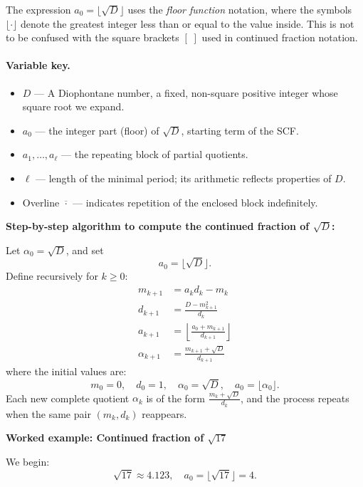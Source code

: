 \documentclass[11pt]{article}
\begin{document}
\smallskip
\noindent
The expression $a_0 = \lfloor \sqrt{D} \rfloor$ uses the \emph{floor function} notation, where the symbols $\lfloor \cdot \rfloor$ denote the greatest integer less than or equal to the value inside. This is not to be confused with the square brackets $[\;]$ used in continued fraction notation.

\paragraph{Variable key.}
\begin{itemize}
  \item $D$ — A Diophontane number, a fixed, non-square positive integer whose square root we expand.
  \item $a_0$ — the integer part (floor) of $\sqrt{D}$, starting term of the SCF.
  \item $a_1,\dots,a_\ell$ — the repeating block of partial quotients.
  \item $\ell$ — length of the minimal period; its arithmetic reflects properties of $D$.
  \item Overline $\overline{\cdot}$ — indicates repetition of the enclosed block indefinitely.
\end{itemize}

\smallskip
\noindent
\textbf{Step-by-step algorithm to compute the continued fraction of \( \sqrt{D} \):}

Let \( \alpha_0 = \sqrt{D} \), and set
\[
a_0 = \lfloor \sqrt{D} \rfloor.
\]
Define recursively for \( k \geq 0 \):
\begin{align*}
m_{k+1} &= a_k d_k - m_k \\
d_{k+1} &= \frac{D - m_{k+1}^2}{d_k} \\
a_{k+1} &= \left\lfloor \frac{a_0 + m_{k+1}}{d_{k+1}} \right\rfloor \\
\alpha_{k+1} &= \frac{m_{k+1} + \sqrt{D}}{d_{k+1}}
\end{align*}
where the initial values are:
\[
m_0 = 0, \quad d_0 = 1, \quad \alpha_0 = \sqrt{D}, \quad a_0 = \lfloor \alpha_0 \rfloor.
\]
Each new complete quotient \( \alpha_k \) is of the form \( \frac{m_k + \sqrt{D}}{d_k} \), and the process repeats when the same pair \( (m_k, d_k) \) reappears.

\bigskip
\noindent
\textbf{Worked example: Continued fraction of \( \sqrt{17} \)}

We begin:
\[
\sqrt{17} \approx 4.123, \quad a_0 = \lfloor \sqrt{17} \rfloor = 4.
\]
\end{document}
